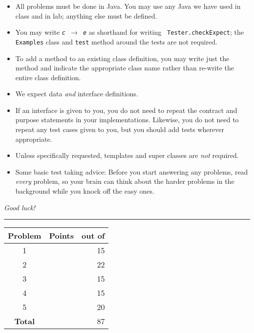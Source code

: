 \documentclass[12pt]{article}                   %
\begin{document}
\noindent\begin{minipage}{8cm}\sloppy
\begin{itemize}
\item All problems must be done in Java. You may use any Java we have
  used in class and in lab; anything else must be defined.

\item You may write {\tt {\slshape c} $\rightarrow$ {\slshape e}} as
  shorthand for writing {\tt
    Tester.checkExpect}; the {\tt Examples} class and {\tt test}
  method around the tests are not required.

\item To add a method to an existing class definition, you
  may write just the method and indicate the appropriate class name
  rather than re-write the entire class definition.

\item We expect data \emph{and} interface definitions.

\item If an interface is given to you, you do not need to repeat the
  contract and purpose statements in your implementations.  Likewise,
  you do not need to repeat any test cases given to you, but you
  should add tests wherever appropriate.



\item Unless specifically requested, templates and super classes are
  \emph{not} required.

\item Some basic test taking advice: Before you start answering
any problems, read \emph{every} problem, so your brain can  think
about the harder problems in the background while you knock off the easy ones.
\end{itemize}

\bigskip

\emph{Good luck!}
\end{minipage}\hfil\begin{minipage}[t]{6cm}
\rule{1cm}{0pt}\begin{tabular}{|c|l|@{/}r|}
\hline
{\bf Problem} & Points & out of \\ \hline
1 & & 15\\ \hline
2 & & 22\\ \hline
3 & & 15\\ \hline
4 & & 15\\ \hline
5 & & 20\\ \hline
{\bf Total} & & 87 \\ \hline
\end{tabular}
\end{minipage}
\end{document}
